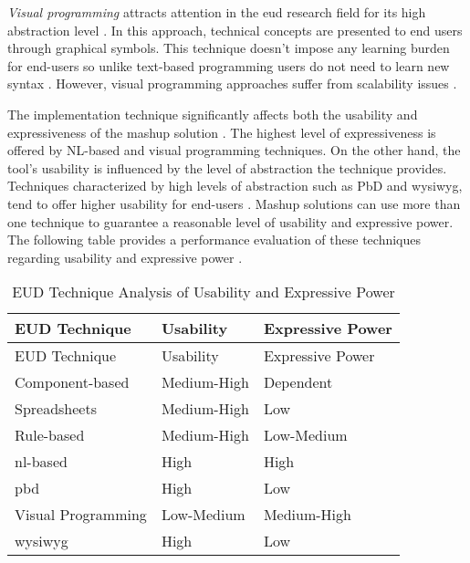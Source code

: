 \emph{Visual programming} attracts attention in the \gls{eud} research field
for its high abstraction level \autocite{Aghaee2014}. In this approach,
technical concepts are presented to end users through graphical symbols.
This technique doesn't impose any learning burden for end-users so
unlike text-based programming users do not need to learn new syntax
\autocite{BURNETT2001}. However, visual programming approaches suffer from
scalability issues \autocite{Paterno2013}.

The implementation technique significantly affects both the usability
and expressiveness of the mashup solution \autocite{Barricelli2019}. The highest level of expressiveness is offered by NL-based and
visual programming techniques. On the other hand, the tool's usability
is influenced by the level of abstraction the technique provides.
Techniques characterized by high levels of abstraction such as PbD and
\gls{wysiwyg}, tend to offer higher usability for end-users \autocite{Aghaee2014}.
Mashup solutions can use more than one technique to guarantee a reasonable
level of usability and expressive power. The following table provides a
performance evaluation of these techniques regarding usability and
expressive power \autocite{Aghaee2014, Aghaee2014a}.

\hypertarget{tbl:edu-techniques}{}
\begin{longtable}{@{}lll@{}}
\caption{\label{tbl:eud-techniques}EUD Technique Analysis of Usability and Expressive Power}\tabularnewline
\toprule
\begin{minipage}[b]{0.30\columnwidth}\raggedright
EUD Technique\strut
\end{minipage} & 
\begin{minipage}[b]{0.30\columnwidth}\raggedright
Usability\strut
\end{minipage} & 
\begin{minipage}[b]{0.38\columnwidth}\raggedright
Expressive Power\strut
\end{minipage} \tabularnewline
\midrule
\endfirsthead

\toprule
\begin{minipage}[b]{0.30\columnwidth}\raggedright
EUD Technique\strut
\end{minipage} & 
\begin{minipage}[b]{0.30\columnwidth}\raggedright
Usability\strut
\end{minipage} & 
\begin{minipage}[b]{0.38\columnwidth}\raggedright
Expressive Power\strut
\end{minipage} \tabularnewline
\midrule
\endhead

Component-based & Medium-High & Dependent \tabularnewline
Spreadsheets & Medium-High & Low \tabularnewline
Rule-based & Medium-High & Low-Medium \tabularnewline
\gls{nl}-based & High & High \tabularnewline
\gls{pbd} & High & Low \tabularnewline
Visual Programming & Low-Medium & Medium-High \tabularnewline
\gls{wysiwyg} & High & Low \tabularnewline

\bottomrule
\end{longtable}

